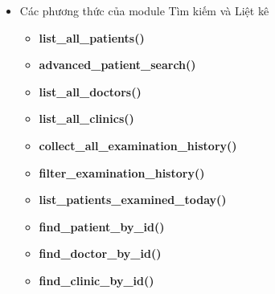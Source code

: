 \begin{itemize}
\begin{itemize}
        \item \textbf{assign\_doctor\_to\_clinic()}
        \item \textbf{remove\_doctor\_from\_clinic()}
    \end{itemize}
    \item Các phương thức của module Tìm kiếm và Liệt kê
    \begin{itemize}
        \item \textbf{list\_all\_patients()}
        \item \textbf{advanced\_patient\_search()}
        \item \textbf{list\_all\_doctors()}
        \item \textbf{list\_all\_clinics()}
        \item \textbf{collect\_all\_examination\_history()}
        \item \textbf{filter\_examination\_history()}
        \item \textbf{list\_patients\_examined\_today()}
        \item \textbf{find\_patient\_by\_id()}
        \item \textbf{find\_doctor\_by\_id()}
        \item \textbf{find\_clinic\_by\_id()}
    \end{itemize}
\end{itemize}